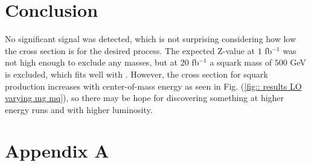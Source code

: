 \documentclass[11pt]{article}
\begin{document}
\section*{Conclusion}
\begin{flushleft}
No significant signal was detected, which is not surprising considering how low the cross section is for the desired process. The expected Z-value at $1$ fb$^{-1}$ was not high enough to exclude any masses, but at $20$ fb$^{-1}$ a squark mass of $500$ GeV is excluded, which fits well with \cite{carquin2015search}. However, the cross section for squark production increases with center-of-mass energy as seen in Fig. (\ref{fig:: results LO varying mg mq}), so there may be hope for discovering something at higher energy runs and with higher luminosity.
\end{flushleft}












\pagebreak


\section*{Appendix A}
\end{document}
